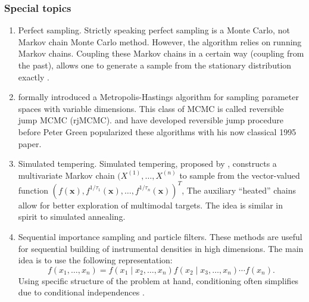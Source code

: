 \documentclass[11pt]{article}\usepackage[]{graphicx}\usepackage[]{color}
\numberwithin{algorithm}{section}
\theoremstyle{remark}
\theoremstyle{definition}
\begin{document}
\subsubsection{Special topics}
\begin{enumerate}
\item Perfect sampling. Strictly speaking perfect sampling is a Monte Carlo, not Markov chain Monte Carlo method.
  However, the algorithm relies on running Markov chains. Coupling these Markov chains in a certain way (coupling
  from the past), allows one to generate a sample from the stationary distribution exactly \citep{Propp1996}.
\item \citet{Green1995} formally introduced a Metropolis-Hastings algorithm for sampling parameter spaces with variable
  dimensions. This class of MCMC is called reversible jump MCMC (rjMCMC). \citet{Newton1992} and \citet{Arjas1994}
  have developed reversible jump procedure before Peter Green popularized these algorithms with his 
  now classical 1995 paper.
\item Simulated tempering. Simulated tempering, proposed by \citet{Geyer1995}, 
  constructs a multivariate Markov chain $(X^{(1)},\dots,X^{(n)}$ to 
  sample from the vector-valued function $(f(\mathbf{x}),f^{1/\tau_1}(\mathbf{x}),\dots,f^{1/\tau_n}(\mathbf{x}))^T$,
  The auxiliary ``heated'' chains allow for better exploration of multimodal targets. The idea is similar in
  spirit to simulated annealing. 
\item Sequential importance sampling and particle filters. These methods are useful for sequential building of
  instrumental densities in high dimensions. The main idea is to use the following representation:
  \[
  f(x_1,\dots,x_n) = f(x_1\mid x_2,\dots,x_n) f(x_2\mid x_3,\dots,x_n)\cdots f(x_n).
  \]
  Using specific structure of the problem at hand, conditioning often simplifies due to conditional independences
  \citep{Liu1998,Chen2005b}.
\end{enumerate}


\end{document}
